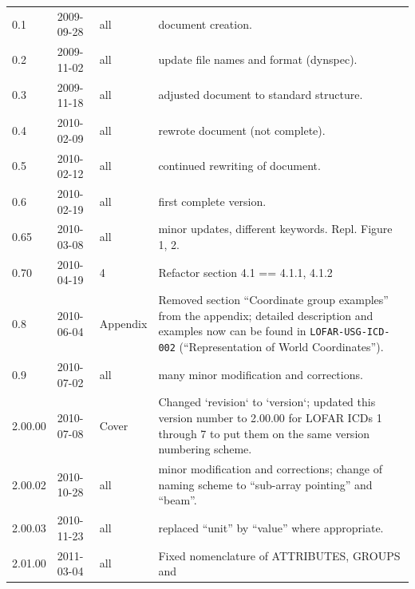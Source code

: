 \documentclass[a4paper,10pt,bibtotoc]{scrartcl}
\begin{document}
\begin{center}
  \tablelasttail{\hline}
  \begin{supertabular}{lllp{10cm}}
    0.1  & 2009-09-28 & all & document creation. \\
    0.2  & 2009-11-02 & all & update file names and format (dynspec). \\
    0.3  & 2009-11-18 & all & adjusted document to standard structure. \\
    0.4  & 2010-02-09 & all & rewrote document (not complete). \\
    0.5  & 2010-02-12 & all & continued rewriting of document. \\
    0.6  & 2010-02-19 & all & first complete version.\\
    0.65 & 2010-03-08 & all & minor updates, different keywords. Repl. Figure 1, 2. \\
    0.70 & 2010-04-19 &   4 & Refactor section 4.1 == 4.1.1, 4.1.2 \\
    0.8  & 2010-06-04 & Appendix & Removed section ``Coordinate group examples''
    from the appendix; detailed description and examples now can be found in
    \texttt{LOFAR-USG-ICD-002} (``Representation of World Coordinates''). \\
    0.9  & 2010-07-02 & all & many minor modification and corrections. \\
    2.00.00  & 2010-07-08 & Cover & Changed `revision` to `version`;  updated 
    this version number to 2.00.00 for LOFAR ICDs 1 through 7 to put them on the same
    version numbering scheme.\\
    2.00.02  & 2010-10-28 & all & minor modification and corrections; change of 
    naming scheme to ``sub-array pointing'' and ``beam''. \\
    2.00.03 & 2010-11-23 & all & replaced ``unit'' by ``value'' where appropriate. \\
    2.01.00 & 2011-03-04 & all & Fixed nomenclature of ATTRIBUTES, GROUPS and

\end{supertabular}
\end{center}
\end{document}
